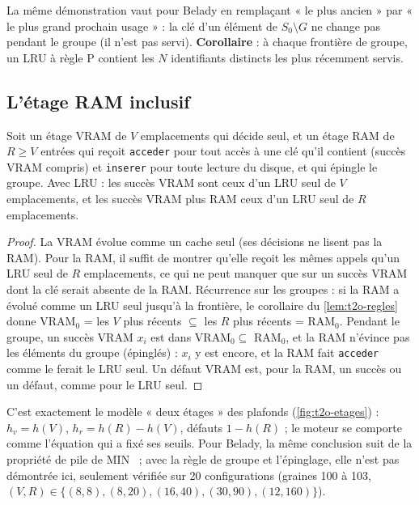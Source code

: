 La même démonstration vaut pour Belady en remplaçant « le plus ancien » par « le plus grand prochain usage » : la clé d'un élément de $S_0 \setminus G$ ne change pas pendant le groupe (il n'est pas servi). \textbf{Corollaire} : à chaque frontière de groupe, un LRU à règle P contient les $N$ identifiants distincts les plus récemment servis.

\subsection{L'étage RAM inclusif}

\begin{lemme}\label{lem:t2o-etages}
Soit un étage VRAM de $V$ emplacements qui décide seul, et un étage RAM de $R \ge V$ entrées qui reçoit \texttt{acceder} pour tout accès à une clé qu'il contient (succès VRAM compris) et \texttt{inserer} pour toute lecture du disque, et qui épingle le groupe. Avec LRU : les succès VRAM sont ceux d'un LRU seul de $V$ emplacements, et les succès VRAM plus RAM ceux d'un LRU seul de $R$ emplacements.
\end{lemme}

\begin{proof}
La VRAM évolue comme un cache seul (ses décisions ne lisent pas la RAM). Pour la RAM, il suffit de montrer qu'elle reçoit les mêmes appels qu'un LRU seul de $R$ emplacements, ce qui ne peut manquer que sur un succès VRAM dont la clé serait absente de la RAM. Récurrence sur les groupes : si la RAM a évolué comme un LRU seul jusqu'à la frontière, le corollaire du \cref{lem:t2o-regles} donne VRAM$_0$ = les $V$ plus récents $\subseteq$ les $R$ plus récents = RAM$_0$. Pendant le groupe, un succès VRAM $x_i$ est dans VRAM$_0 \subseteq$ RAM$_0$, et la RAM n'évince pas les éléments du groupe (épinglés) : $x_i$ y est encore, et la RAM fait \texttt{acceder} comme le ferait le LRU seul. Un défaut VRAM est, pour la RAM, un succès ou un défaut, comme pour le LRU seul.
\end{proof}

C'est exactement le modèle « deux étages » des plafonds (\cref{fig:t2o-etages}) : $h_v = h(V)$, $h_r = h(R) - h(V)$, défauts $1 - h(R)$ ; le moteur se comporte comme l'équation qui a fixé ses seuils. Pour Belady, la même conclusion suit de la propriété de pile de MIN~\cite{mattson1970} ; avec la règle de groupe et l'épinglage, elle n'est pas démontrée ici, seulement vérifiée sur 20 configurations (graines 100 à 103, $(V, R) \in \{(8, 8), (8, 20), (16, 40), (30, 90), (12, 160)\}$).

